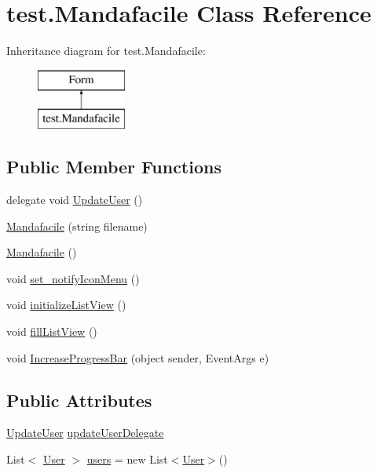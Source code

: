 \hypertarget{classtest_1_1_mandafacile}{}\section{test.\+Mandafacile Class Reference}
\label{classtest_1_1_mandafacile}
Inheritance diagram for test.\+Mandafacile\+:\begin{figure}[H]
\begin{center}
\leavevmode
\includegraphics[height=2.000000cm]{classtest_1_1_mandafacile}
\end{center}
\end{figure}
\subsection*{Public Member Functions}
\begin{DoxyCompactItemize}
\item 
delegate void \hyperlink{classtest_1_1_mandafacile_a314bfe1e315b47325030221b65112ed1}{Update\+User} ()
\item 
\hyperlink{classtest_1_1_mandafacile_a4de0d94073e5e8b0cdb9d70fbe86ec9d}{Mandafacile} (string filename)
\item 
\hyperlink{classtest_1_1_mandafacile_ac93bfc355fea31d877ad72aca5d4f510}{Mandafacile} ()
\item 
void \hyperlink{classtest_1_1_mandafacile_a2b2da681ae8e0414052927c88f2836ed}{set\+\_\+notify\+Icon\+Menu} ()
\item 
void \hyperlink{classtest_1_1_mandafacile_a5e24ce244b18a4089dc3022d07a1d2ce}{initialize\+List\+View} ()
\item 
void \hyperlink{classtest_1_1_mandafacile_a976502d552148bfd98fe1e4daa928032}{fill\+List\+View} ()
\item 
void \hyperlink{classtest_1_1_mandafacile_a18ac856ce19366c545d111ee5c999372}{Increase\+Progress\+Bar} (object sender, Event\+Args e)
\end{DoxyCompactItemize}
\subsection*{Public Attributes}
\begin{DoxyCompactItemize}
\item 
\hyperlink{classtest_1_1_mandafacile_a314bfe1e315b47325030221b65112ed1}{Update\+User} \hyperlink{classtest_1_1_mandafacile_a8e3576435cdf537453765a8809c82f6b}{update\+User\+Delegate}
\item 
List$<$ \hyperlink{classtest_1_1_user}{User} $>$ \hyperlink{classtest_1_1_mandafacile_a9c4b7d85a2f3f10751fd5e304213eea2}{users} = new List$<$\hyperlink{classtest_1_1_user}{User}$>$()
\end{DoxyCompactItemize}
